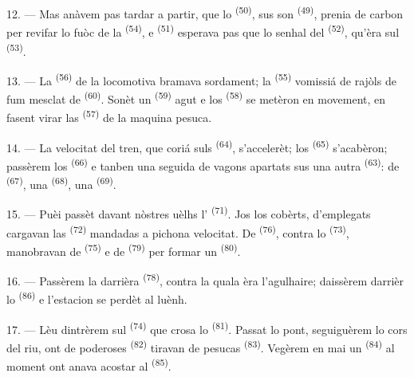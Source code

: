 12. --- Mas anàvem pas tardar a partir, que lo 
\textsuperscript{(50)}, sus son  \textsuperscript{(49)}, prenia de
carbon per revifar lo fuòc de la  \textsuperscript{(54)}, e
 \textsuperscript{(51)} esperava pas que lo senhal del
 \textsuperscript{(52)}, qu'èra sul 
\textsuperscript{(53)}.

13. --- La  \textsuperscript{(56)} de la locomotiva bramava
sordament; la  \textsuperscript{(55)} vomissiá de rajòls de fum
mesclat de  \textsuperscript{(60)}. Sonèt un 
\textsuperscript{(59)} agut e los  \textsuperscript{(58)} se
metèron en movement, en fasent virar las  \textsuperscript{(57)} de
la maquina pesuca.

\VUsaut{3.0mm}
\VUsaut{3.0mm}

14. --- La velocitat del tren, que coriá suls 
\textsuperscript{(64)}, s'accelerèt; los  \textsuperscript{(65)}
s'acabèron; passèrem los  \textsuperscript{(66)} e tanben una
seguida de vagons apartats sus una autra  \textsuperscript{(63)}: de
 \textsuperscript{(67)}, una 
\textsuperscript{(68)}, una  \textsuperscript{(69)}.


15. --- Puèi passèt davant nòstres uèlhs l'
\textsuperscript{(71)}. Jos los cobèrts, d'emplegats cargavan las
 \textsuperscript{(72)} mandadas a pichona velocitat. De
 \textsuperscript{(76)}, contra lo  \textsuperscript{(73)}, manobravan de 
\textsuperscript{(75)} e de  \textsuperscript{(79)} per
formar un  \textsuperscript{(80)}.

16. --- Passèrem la darrièra  \textsuperscript{(78)}, contra la
quala èra l'agulhaire; daissèrem darrièr lo 
\textsuperscript{(86)} e l'estacion se perdèt al luènh.

17. --- Lèu dintrèrem sul  \textsuperscript{(74)} que crosa
lo  \textsuperscript{(81)}. Passat lo pont, seguiguèrem lo cors del
riu, ont de poderoses  \textsuperscript{(82)} tiravan de
pesucas  \textsuperscript{(83)}. Vegèrem en mai un  \textsuperscript{(84)} al moment ont anava acostar al
 \textsuperscript{(85)}.

